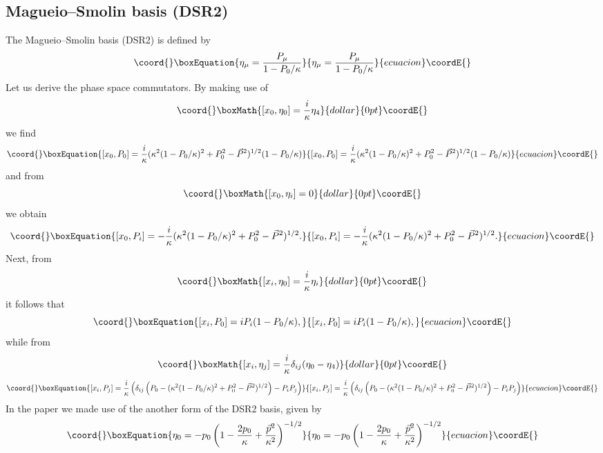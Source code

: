 \documentclass  [12pt] {article}
\begin{document}
\subsection*{Magueio--Smolin basis (DSR2)}

The Magueio--Smolin basis (DSR2) \cite{Magueijo:2001cr} is defined
by
\begin{equation}\coord{}\boxEquation{
 \eta_{\mu}=\frac{P_{\mu}}{1-P_{0}/\kappa}
}{
 \eta_{\mu}=\frac{P_{\mu}}{1-P_{0}/\kappa}
}{ecuacion}\coordE{}\end{equation}
Let us derive the phase space commutators. By making use of
$$\coord{}\boxMath{
 [x_{0},\eta_{0}]=\frac{i}{\kappa}\eta_{4}
}{dollar}{0pt}\coordE{}$$
we find
\begin{equation}\coord{}\boxEquation{
 [x_{0},P_{0}]=\frac{i}{\kappa}(\kappa^{2}(1-P_{0}/\kappa)^{2}+P_{0}^{2}-\vec{P}^{2})^{1/2}(1-P_{0}/\kappa)
}{
 [x_{0},P_{0}]=\frac{i}{\kappa}(\kappa^{2}(1-P_{0}/\kappa)^{2}+P_{0}^{2}-\vec{P}^{2})^{1/2}(1-P_{0}/\kappa)
}{ecuacion}\coordE{}\end{equation}
and from
$$\coord{}\boxMath{
 [x_{0},\eta_{i}]=0
}{dollar}{0pt}\coordE{}$$
we obtain
\begin{equation}\coord{}\boxEquation{
 [x_{0},P_{i}]=-\frac{i}{\kappa}(\kappa^{2}(1-P_{0}/\kappa)^{2}+P_{0}^{2}-\vec{P}^{2})^{1/2}.
}{
 [x_{0},P_{i}]=-\frac{i}{\kappa}(\kappa^{2}(1-P_{0}/\kappa)^{2}+P_{0}^{2}-\vec{P}^{2})^{1/2}.
}{ecuacion}\coordE{}\end{equation}
Next, from
$$\coord{}\boxMath{
 [x_{i},\eta_{0}]=\frac{i}{\kappa}\eta_{i}
}{dollar}{0pt}\coordE{}$$
it follows that
\begin{equation}\coord{}\boxEquation{
 [x_{i},P_{0}]=iP_{i}(1-P_{0}/\kappa),
}{
 [x_{i},P_{0}]=iP_{i}(1-P_{0}/\kappa),
}{ecuacion}\coordE{}\end{equation}
while from
$$\coord{}\boxMath{
 [x_{i},\eta_{j}]=\frac{i}{\kappa}\delta_{ij}(\eta_{0}-\eta_{4})
}{dollar}{0pt}\coordE{}$$
\begin{equation}\coord{}\boxEquation{
 [x_{i},P_{j}]=\frac{i}{\kappa}\left(\delta_{ij}\left(P_{0}-(\kappa^{2}(1-P_{0}/\kappa)^{2}+P_{0}^{2}-\vec{P}^{2})^{1/2}\right)
 -P_{i}P_{j} \right)
}{
 [x_{i},P_{j}]=\frac{i}{\kappa}\left(\delta_{ij}\left(P_{0}-(\kappa^{2}(1-P_{0}/\kappa)^{2}+P_{0}^{2}-\vec{P}^{2})^{1/2}\right)
 -P_{i}P_{j} \right)
}{ecuacion}\coordE{}\end{equation}
 In the paper \cite{Kowalski-Glikman:2002jr} we made use of the
 another form of the DSR2 basis, given by
 \begin{equation}\coord{}\boxEquation{
 \eta_{0}=-p_{0}\left(1-\frac{2p_{0}}{\kappa}+\frac{\vec{p}^{2}}
 {\kappa^{2}} \right)^{-1/2}
}{
 \eta_{0}=-p_{0}\left(1-\frac{2p_{0}}{\kappa}+\frac{\vec{p}^{2}}
 {\kappa^{2}} \right)^{-1/2}
}{ecuacion}\coordE{}\end{equation}
\end{document}
